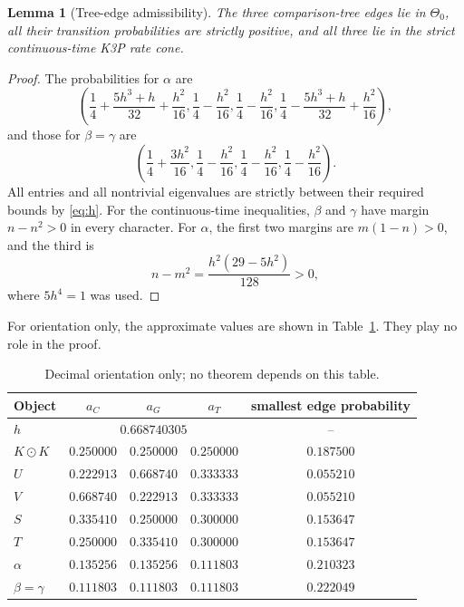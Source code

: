 \documentclass[11pt]{article}
\newtheorem{lemma}[theorem]{Lemma}
\theoremstyle{remark}
\newcommand{\ThetaZero}{\Theta_{0}}
\newcommand{\odotv}{\mathbin{\odot}}
\begin{document}
\begin{lemma}[Tree-edge admissibility]\label{lem:tree-adm}
The three comparison-tree edges lie in $\ThetaZero$, all their transition probabilities are strictly positive, and all three lie in the strict continuous-time K3P rate cone.
\end{lemma}

\begin{proof}
The probabilities for $\alpha$ are
\begin{equation}\label{eq:alpha-probs}
 \left(
 \frac14+\frac{5h^3+h}{32}+\frac{h^2}{16},
 \frac14-\frac{h^2}{16},
 \frac14-\frac{h^2}{16},
 \frac14-\frac{5h^3+h}{32}+\frac{h^2}{16}
 \right),
\end{equation}
and those for $\beta=\gamma$ are
\begin{equation}\label{eq:beta-probs}
 \left(
 \frac14+\frac{3h^2}{16},
 \frac14-\frac{h^2}{16},
 \frac14-\frac{h^2}{16},
 \frac14-\frac{h^2}{16}
 \right).
\end{equation}
All entries and all nontrivial eigenvalues are strictly between their required bounds by \eqref{eq:h}.  For the continuous-time inequalities, $\beta$ and $\gamma$ have margin $n-n^2>0$ in every character.  For $\alpha$, the first two margins are $m(1-n)>0$, and the third is
\[
 n-m^2=\frac{h^2(29-5h^2)}{128}>0,
\]
where $5h^4=1$ was used.
\end{proof}

For orientation only, the approximate values are shown in Table~\ref{tab:numerics}.  They play no role in the proof.

\begin{table}[ht]
\centering
\caption{Decimal orientation only; no theorem depends on this table.}
\label{tab:numerics}
\begin{tabular}{@{}lcccc@{}}
\toprule
Object & $a_C$ & $a_G$ & $a_T$ & smallest edge probability \\
\midrule
$h$ & \multicolumn{3}{c}{$0.668740305$} & --\\
$K\odotv K$ & $0.250000$ & $0.250000$ & $0.250000$ & $0.187500$\\
$U$ & $0.222913$ & $0.668740$ & $0.333333$ & $0.055210$\\
$V$ & $0.668740$ & $0.222913$ & $0.333333$ & $0.055210$\\
$S$ & $0.335410$ & $0.250000$ & $0.300000$ & $0.153647$\\
$T$ & $0.250000$ & $0.335410$ & $0.300000$ & $0.153647$\\
$\alpha$ & $0.135256$ & $0.135256$ & $0.111803$ & $0.210323$\\
$\beta=\gamma$ & $0.111803$ & $0.111803$ & $0.111803$ & $0.222049$\\
\bottomrule
\end{tabular}
\end{table}
\end{document}
